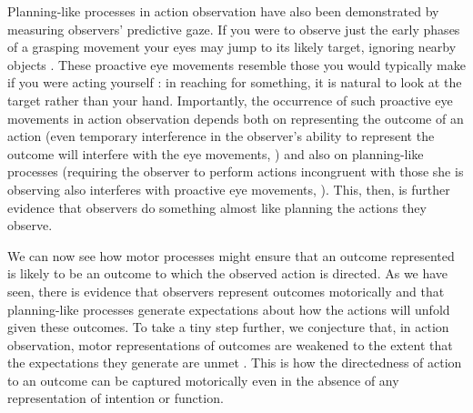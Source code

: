 \documentclass[12pt,\papersize]{extarticle}
\begin{document}
Planning-like processes in action observation have also been demonstrated by measuring observers’ predictive gaze.  If you were to observe just the early phases of a grasping movement your eyes may jump to its likely target, ignoring nearby objects \citep{ambrosini:2011_grasping}. These proactive eye movements resemble those you would typically make if you were acting yourself \citep{Flanagan:2003lm}: in reaching for something, it is natural to look at the target rather than your hand.  Importantly, the occurrence of such proactive eye movements in action observation depends both on representing the outcome of an action (even temporary interference in the observer's ability to represent the outcome will interfere with the eye movements, \citealp{Costantini:2012fk}) and also on planning-like processes (requiring the observer to perform actions incongruent with those she is observing also interferes with proactive eye movements, \citealp{Costantini:2012uq}).  This, then, is further evidence that observers do something almost like planning the actions they observe.  

We can now see how motor processes might ensure that an outcome represented is likely to be an outcome to which the observed action is directed.  As we have seen, there is evidence that observers represent outcomes motorically and that planning-like processes generate expectations about how the actions will unfold given these outcomes.  To take a tiny step further, we conjecture that, in action observation, motor representations of outcomes are weakened to the extent that the expectations they generate are unmet \citep[compare][]{Fogassi:2005nf}. This is how the directedness of action to an outcome can be captured motorically even in the absence of any representation of intention or function.
\end{document}
